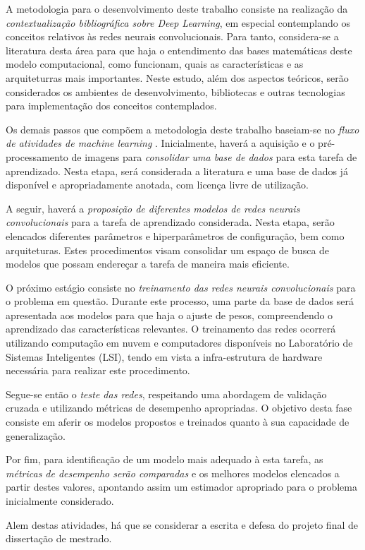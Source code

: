 A metodologia para o desenvolvimento deste trabalho consiste na realização da \emph{contextualização bibliográfica sobre Deep Learning}, em especial contemplando os conceitos relativos às redes neurais convolucionais. Para tanto, considera-se a literatura desta área para que haja o entendimento das bases matemáticas deste modelo computacional, como funcionam, quais as características e as arquiteturras mais importantes. Neste estudo, além dos aspectos teóricos, serão considerados os ambientes de desenvolvimento, bibliotecas e outras tecnologias para implementação dos conceitos contemplados.

Os demais passos que compõem a metodologia deste trabalho baseiam-se no \emph{fluxo de atividades de machine learning} \cite{marsland2015machine}. Inicialmente, haverá a aquisição e o pré-processamento de imagens para \emph{consolidar uma base de dados} para esta tarefa de aprendizado. Nesta etapa, será considerada a literatura e uma base de dados já disponível e apropriadamente anotada, com licença livre de utilização.

A seguir, haverá a \emph{proposição de diferentes modelos de redes neurais convolucionais} para a tarefa de aprendizado considerada. Nesta etapa, serão elencados diferentes parâmetros e hiperparâmetros de configuração, bem como arquiteturas. Estes procedimentos visam consolidar um espaço de busca de modelos que possam endereçar a tarefa de maneira mais eficiente.

O próximo estágio consiste no \emph{treinamento das redes neurais convolucionais} para o problema em questão. Durante este processo, uma parte da base de dados será apresentada aos modelos para que haja o ajuste de pesos, compreendendo o aprendizado das características relevantes. O treinamento das redes ocorrerá utilizando computação em nuvem e computadores disponíveis no Laboratório de Sistemas Inteligentes (LSI), tendo em vista a infra-estrutura de hardware necessária para realizar este procedimento.

Segue-se então o \emph{teste das redes}, respeitando uma abordagem de validação cruzada e utilizando métricas de desempenho apropriadas. O objetivo desta fase consiste em aferir os modelos propostos e treinados quanto à sua capacidade de generalização.

Por fim, para identificação de um modelo mais adequado à esta tarefa, as \emph{métricas de desempenho serão comparadas} e os melhores modelos elencados a partir destes valores, apontando assim um estimador apropriado para o problema inicialmente considerado.

Alem destas atividades, há que se considerar a escrita e defesa do projeto final de dissertação de mestrado.
